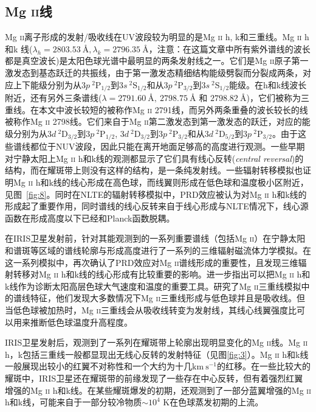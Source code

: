 \subsection{Mg \textsc{ii}线}
Mg \textsc{ii}离子形成的发射/吸收线在UV波段较为明显的是Mg \textsc{ii} h, k和三重线。Mg \textsc{ii} h和k 线($\lambda_h = 2803.53~\mbox{\AA}, \lambda_k = 2796.35~\mbox{\AA}$，注意：在这篇文章中所有紫外谱线的波长都是真空波长)是太阳色球光谱中最明显的两条发射线之一。它们是Mg \textsc{ii}原子第一激发态到基态跃迁的共振线，由于第一激发态精细结构能级劈裂而分裂成两条，对应上下能级分别为从$3p\ ^2\mathrm{P}_{1/2}$到$3s\ ^2\mathrm{S}_{1/2}$和从$3p\ ^2\mathrm{P}_{3/2}$到$3s\ ^2\mathrm{S}_{1/2}$能级。在h和k线波长附近，还有另外三条谱线($\lambda = 2791.60~\mbox{\AA},\ 2798.75~\mbox{\AA}$ 和 $2798.82~\mbox{\AA}$)，它们被称为三重线。在本文中波长较短的被称作Mg \textsc{ii} 2791线，而另外两条重叠的波长较长的线被称作Mg \textsc{ii} 2798线。它们来自于Mg \textsc{ii}第二激发态到第一激发态的跃迁，对应的能级分别为从$3d\ ^2\mathrm{D}_{3/2}$到$3p\ ^2\mathrm{P}_{1/2}$, $3d\ ^2\mathrm{D}_{3/2}$到$3p\ ^2\mathrm{P}_{3/2}$和从$3d\ ^2\mathrm{D}_{5/2}$到$3p\ ^2\mathrm{P}_{3/2}$。由于这些谱线都位于NUV波段，因此只能在离开地面足够高的高度进行观测。一些早期对宁静太阳上Mg \textsc{ii} h和k线的观测都显示了它们具有线心反转(\textit{central reversal})的结构\parencite{Lemaire1967,Lemaire1969,Doschek1977}，而在耀斑带上则没有这样的结构，是一条纯发射线\parencite{Kohl1976K,Feldman1977}。一些辐射转移模拟也证明Mg \textsc{ii} h和k线的线心形成在高色球，而线翼则形成在低色球和温度极小区附近\parencite{Vernazza1981}，见图~\ref{fig:8}。同时在NLTE的辐射转移模拟中，PRD效应被认为对Mg \textsc{ii} h和k线的形成起了重要作用，同时谱线的线心反转来自于线心形成与NLTE情况下，线心源函数在形成高度以下已经和Planck函数脱耦\parencite{Milkey1974,Ayres1976,Uitenbroek1997}。

在IRIS卫星发射前，针对其能观测到的一系列重要谱线（包括Mg \textsc{ii}）在宁静太阳和谱斑等区域的谱线轮廓与形成高度进行了一系列的三维辐射磁流体力学模拟。在这一系列模拟中，再次确认了PRD效应对Mg \textsc{ii}谱线形成的重要性，且发现三维辐射转移对Mg \textsc{ii} h和k线的线心形成有比较重要的影响\parencites{Leenaarts2013a}。\textcites{Leenaarts2013b}进一步指出可以把Mg \textsc{ii} h和k线作为诊断太阳高层色球大气速度和温度的重要工具。\textcites{Pereira2015}研究了Mg \textsc{ii}三重线模拟中的谱线特征，他们发现大多数情况下Mg \textsc{ii}三重线形成与低色球并且是吸收线。但当低色球被加热时，Mg \textsc{ii}三重线会从吸收线转变为发射线，其线心线翼强度比可以用来推断低色球温度升高程度。

IRIS卫星发射后，观测到了一系列在耀斑带上轮廓出现明显变化的Mg \textsc{ii}线。Mg \textsc{ii} h，k包括三重线一般都显现出无线心反转的发射特征（见图\ref{fig:3}）\parencites{Tian2015,Kerr2015,Tian2018}。Mg \textsc{ii} h和k线一般展现出较小的红翼不对称性和一个大约为十几$ \mathrm{km}\ \mathrm{s^{-1}}$的红移\parencites{Li2015,Li2017,Tian2018}。在一些比较大的耀斑中，IRIS卫星还在耀斑带的前缘发现了一些存在中心反转，但有着强烈红翼增强的Mg \textsc{ii} h和k线\parencites{Liu2015,Panos2018}。在某些耀斑爆发的初期，还观测到了一部分蓝翼增强的Mg \textsc{ii} h和k线，可能来自于一部分较冷物质$\sim10^4$ K在色球蒸发初期的上流\parencites{Tei2018}。

